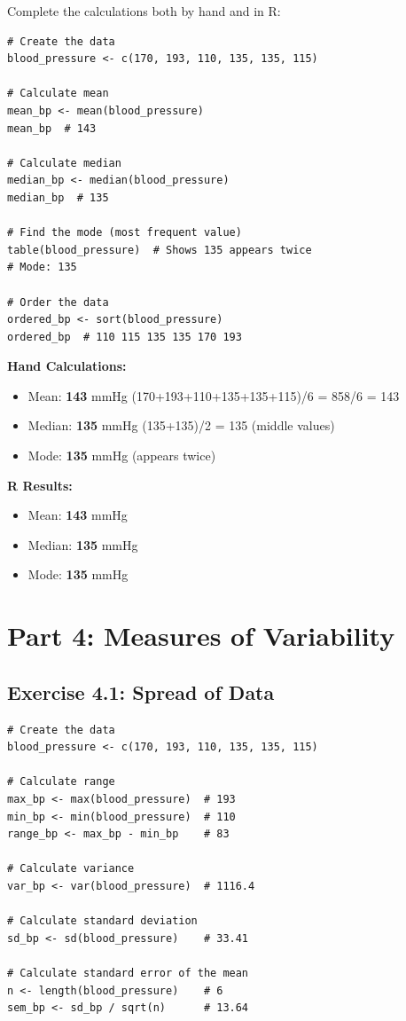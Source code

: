 \documentclass[11pt]{article}
\begin{document}
Complete the calculations both by hand and in R:

\begin{lstlisting}
# Create the data
blood_pressure <- c(170, 193, 110, 135, 135, 115)

# Calculate mean
mean_bp <- mean(blood_pressure)
mean_bp  # 143

# Calculate median
median_bp <- median(blood_pressure)
median_bp  # 135

# Find the mode (most frequent value)
table(blood_pressure)  # Shows 135 appears twice
# Mode: 135

# Order the data
ordered_bp <- sort(blood_pressure)
ordered_bp  # 110 115 135 135 170 193
\end{lstlisting}

\textbf{Hand Calculations:}
\begin{itemize}
\item Mean: \textcolor{answergreen}{\textbf{143}} mmHg \textcolor{answergreen}{(170+193+110+135+135+115)/6 = 858/6 = 143}
\item Median: \textcolor{answergreen}{\textbf{135}} mmHg \textcolor{answergreen}{(135+135)/2 = 135 (middle values)}
\item Mode: \textcolor{answergreen}{\textbf{135}} mmHg \textcolor{answergreen}{(appears twice)}
\end{itemize}

\textbf{R Results:}
\begin{itemize}
\item Mean: \textcolor{answergreen}{\textbf{143}} mmHg
\item Median: \textcolor{answergreen}{\textbf{135}} mmHg
\item Mode: \textcolor{answergreen}{\textbf{135}} mmHg
\end{itemize}

\newpage
\section{Part 4: Measures of Variability}

\subsection{Exercise 4.1: Spread of Data}
\begin{lstlisting}
# Create the data
blood_pressure <- c(170, 193, 110, 135, 135, 115)

# Calculate range
max_bp <- max(blood_pressure)  # 193
min_bp <- min(blood_pressure)  # 110
range_bp <- max_bp - min_bp    # 83

# Calculate variance
var_bp <- var(blood_pressure)  # 1116.4

# Calculate standard deviation
sd_bp <- sd(blood_pressure)    # 33.41

# Calculate standard error of the mean
n <- length(blood_pressure)    # 6
sem_bp <- sd_bp / sqrt(n)      # 13.64
\end{lstlisting}
\end{document}
